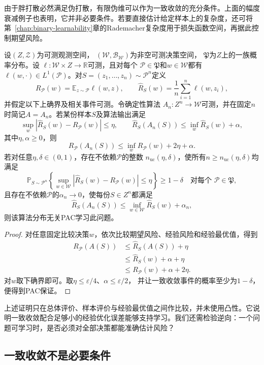 由于胖打散必然满足伪打散，有限伪维可以作为一致收敛的充分条件。上面的幅度衰减例子也表明，它并非必要条件。若要直接估计给定样本上的复杂度，还可将第~\ref{chap:binary-learnability}章的Rademacher复杂度用于损失函数空间，再据此控制期望风险。

\begin{theorem}[一致收敛推出一般学习保证]
\label{thm:general-uniform-pac}
设$(Z,\mathcal Z)$为可测观测空间，
$(\mathcal W,\mathcal B_{\mathcal W})$为非空可测决策空间，
$\mathfrak P$为$Z$上的一族概率分布。设
$\ell:\mathcal W\times Z\to\mathbb R$可测，且对每个
$\mathcal P\in\mathfrak P$和$w\in\mathcal W$都有
$\ell(w,\cdot)\in L^1(\mathcal P)$。对$S=(z_1,\ldots,z_n)\sim\mathcal P^n$定义
\[
 R_{\mathcal P}(w)=\mathbb E_{z\sim\mathcal P}\ell(w,z),
 \qquad
 \hat R_S(w)=\frac1n\sum_{i=1}^n\ell(w,z_i),
\]
并假定以下上确界及相关事件可测。令确定性算法
$A_n:Z^n\to\mathcal W$可测，并在固定$n$时简记$A=A_n$。若某份样本$S$及算法输出满足
\[
 \sup_w|\hat R_S(w)-R_{\mathcal P}(w)|\leq\eta,\qquad
 \hat R_S(A_n(S))\leq\inf_w\hat R_S(w)+\alpha,
\]
其中$\eta,\alpha\geq0$，则
\[
 R_{\mathcal P}(A_n(S))\leq\inf_w R_{\mathcal P}(w)+2\eta+\alpha.
\]
若对任意$\eta,\delta\in(0,1)$，存在不依赖$\mathcal P$的整数
$n_{\mathrm{uc}}(\eta,\delta)$，使所有$n\geq n_{\mathrm{uc}}(\eta,\delta)$均满足
\[
 \mathbb P_{S\sim\mathcal P^n}\!\left\{
 \sup_{w\in\mathcal W}|\hat R_S(w)-R_{\mathcal P}(w)|\leq\eta
 \right\}\geq1-\delta
 \quad\text{对每个 }\mathcal P\in\mathfrak P,
\]
且存在不依赖$\mathcal P$的$\alpha_n\to0$，使每份$S\in Z^n$都满足
\[
 \hat R_S(A_n(S))\leq\inf_{w\in\mathcal W}\hat R_S(w)+\alpha_n,
\]
则该算法分布无关PAC学习此问题。
\end{theorem}
\begin{proof}
对任意固定比较决策$w$，依次比较期望风险、经验风险和经验最优值，得到
\begin{align*}
 R_{\mathcal P}(A(S))&\leq\hat R_S(A(S))+\eta\\
 &\leq\hat R_S(w)+\alpha+\eta\\
 &\leq R_{\mathcal P}(w)+\alpha+2\eta.
\end{align*}
对$w$取下确界即可。取$\eta\leq\varepsilon/4$、$\alpha\leq\varepsilon/2$，
并让一致收敛事件的概率至少为$1-\delta$，便得到PAC保证。
\end{proof}

上述证明只在总体评价、样本评价与经验最优值之间作比较，并未使用凸性。它说明一致收敛配合足够小的经验优化误差能够支持学习。我们还需检验逆向：一个问题可学习时，是否必须对全部决策都能准确估计风险？

\subsection{一致收敛不是必要条件}

